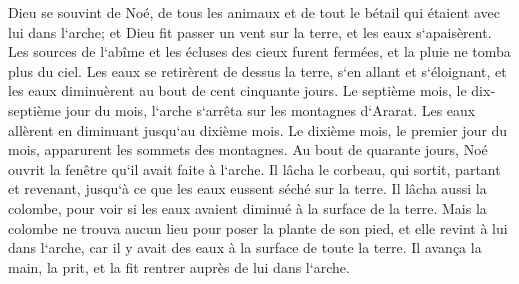 \verse Dieu se souvint de Noé, de tous les animaux et de tout le bétail qui étaient avec lui dans l`arche; et Dieu fit passer un vent sur la terre, et les eaux s`apaisèrent. 
\verse Les sources de l`abîme et les écluses des cieux furent fermées, et la pluie ne tomba plus du ciel. 
\verse Les eaux se retirèrent de dessus la terre, s`en allant et s`éloignant, et les eaux diminuèrent au bout de cent cinquante jours. 
\verse Le septième mois, le dix-septième jour du mois, l`arche s`arrêta sur les montagnes d`Ararat. 
\verse Les eaux allèrent en diminuant jusqu`au dixième mois. Le dixième mois, le premier jour du mois, apparurent les sommets des montagnes. 
\verse Au bout de quarante jours, Noé ouvrit la fenêtre qu`il avait faite à l`arche. 
\verse Il lâcha le corbeau, qui sortit, partant et revenant, jusqu`à ce que les eaux eussent séché sur la terre. 
\verse Il lâcha aussi la colombe, pour voir si les eaux avaient diminué à la surface de la terre. 
\verse Mais la colombe ne trouva aucun lieu pour poser la plante de son pied, et elle revint à lui dans l`arche, car il y avait des eaux à la surface de toute la terre. Il avança la main, la prit, et la fit rentrer auprès de lui dans l`arche. 
